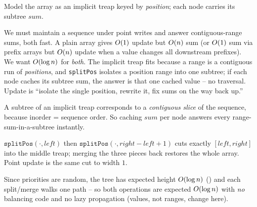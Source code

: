\begin{attemptgate}
Model the array as an implicit treap keyed by \emph{position}; each node carries its subtree $\mathit{sum}$.
\end{attemptgate}

We must maintain a sequence under point writes and answer contiguous-range sums, both fast. A plain array
gives $O(1)$ update but $O(n)$ sum (or $O(1)$ sum via prefix arrays but $O(n)$ update when
a value changes all downstream prefixes). We want $O(\log n)$ for \emph{both}. The implicit treap fits
because a range is a contiguous run of \emph{positions}, and \texttt{splitPos} isolates a position range
into one subtree; if each node caches its subtree sum, the answer is that one cached value -- no traversal.
Update is ``isolate the single position, rewrite it, fix sums on the way back up.''

\begin{observation}
A subtree of an implicit treap corresponds to a \emph{contiguous slice} of the sequence, because inorder =
sequence order. So caching $\mathit{sum}$ per node answers every range-sum-in-a-subtree instantly.
\end{observation}
\begin{observation}
$\texttt{splitPos}(\cdot,\mathit{left})$ then $\texttt{splitPos}(\cdot,\mathit{right}-\mathit{left}+1)$
cuts exactly $[\mathit{left},\mathit{right}]$ into the middle treap; merging the three pieces back restores
the whole array. Point update is the same cut to width $1$.
\end{observation}
\begin{observation}
Since priorities are random, the tree has expected height $O(\log n)$ () and each
split/merge walks one path -- so both operations are expected $O(\log n)$ with \emph{no} balancing code
and no lazy propagation (values, not ranges, change here).
\end{observation}

